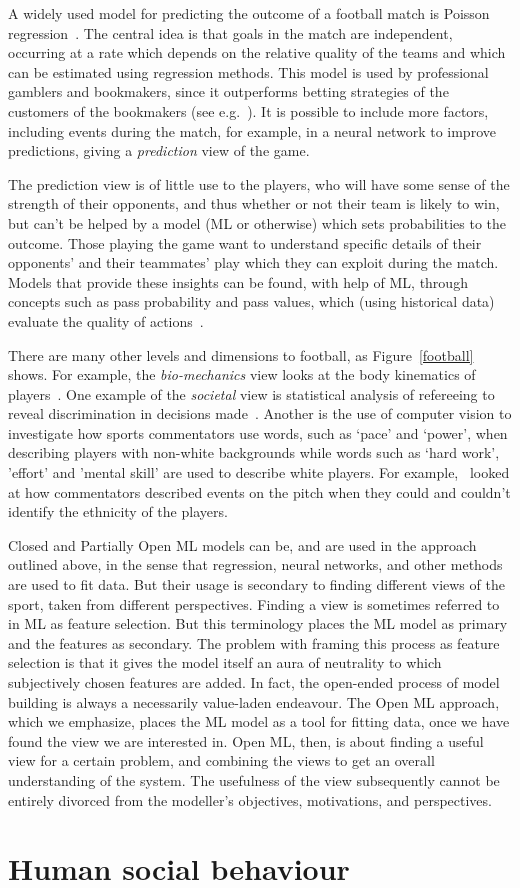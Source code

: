 A widely used model for predicting the outcome of a football match is Poisson regression~\cite{dixon1997modelling}. The central idea is that goals in the match 
are independent, occurring at a rate which depends on the relative quality of the teams and which can be estimated using regression methods.
This model is used by professional gamblers and bookmakers, since it outperforms betting strategies of the customers of the bookmakers (see e.g.~\cite{spann2009sports}). It is possible to include more factors, including events during the match, for example, in a neural network to improve predictions, giving a \textit{prediction} view of the game.

The prediction view is of little use to the players, who will have some sense of the strength of their opponents, and thus whether or not their team is likely to win, but can't be helped by a model (ML or otherwise) which sets probabilities to the outcome. Those playing the game want to understand specific details of their opponents' and their teammates' play which they can exploit during the match. Models that provide these insights can be found, with help of ML, through concepts such as pass probability and pass values, which (using historical data) evaluate the quality of actions~\cite{fernandez2019decomposing,sumpter2016soccermatics}. 

There are many other levels and dimensions to football, as Figure~\ref{football} shows. For example, the \textit{bio-mechanics} view looks at the body kinematics of players~\cite{ibrahim2019kinematic}. One example of the \textit{societal} view is statistical analysis of refereeing to reveal discrimination 
in decisions made~\cite{gallo2013punishing}. Another is the use of computer vision to investigate how sports commentators use words, such as `pace' and `power', when describing players with non-white backgrounds while words such as `hard work', 'effort' and 'mental skill' are used to describe white players. For example,~\cite{Gregory2021Pace} looked at how commentators described events on the pitch when they could and couldn't identify the ethnicity of the players.

Closed and Partially Open ML models can be, and are used in the approach outlined above, in the sense that regression, neural networks, and other methods are used to fit data. But their usage is secondary to finding different views of the sport, taken from different perspectives. Finding a view is sometimes referred to in ML as feature selection. But this terminology places the ML model as primary and the features as secondary. The problem with framing this process as feature selection is that it gives the model itself an aura of neutrality to which subjectively chosen features are added. In fact, the open-ended process of model building is always a necessarily value-laden endeavour. The Open ML approach, which we emphasize, places the ML model as a tool for fitting data, once we have found the view we are interested in. Open ML, then, is about finding a useful view for a certain problem, and combining the views to get an overall understanding of the system. The usefulness of the view subsequently cannot be entirely divorced from the modeller's objectives, motivations, and perspectives.  

\section{Human social behaviour}


